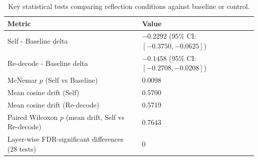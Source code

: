 \begin{table}[t]
\centering
\caption{Key statistical tests comparing reflection conditions against baseline or control.}
\label{tab:stats}
\begin{tabular}{@{}ll@{}}
\toprule
Metric & Value \\
\midrule
Self - Baseline delta & $-0.2292$ (95\% CI: $[-0.3750,-0.0625]$) \\
Re-decode - Baseline delta & $-0.1458$ (95\% CI: $[-0.2708,-0.0208]$) \\
McNemar $p$ (Self vs Baseline) & 0.0098 \\
Mean cosine drift (Self) & 0.5700 \\
Mean cosine drift (Re-decode) & 0.5719 \\
Paired Wilcoxon $p$ (mean drift, Self vs Re-decode) & 0.7643 \\
Layer-wise FDR-significant differences (28 tests) & 0 \\
\bottomrule
\end{tabular}
\end{table}
